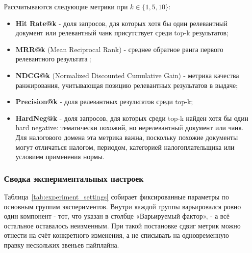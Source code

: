 \documentclass[a4paper,12pt]{article}
\begin{document}
Рассчитываются следующие метрики при $k \in \{1, 5, 10\}$:
\begin{itemize}
  \item \textbf{Hit Rate@k} - доля запросов, для которых хотя бы один релевантный документ или релевантный чанк присутствует среди top-k результатов;
  \item \textbf{MRR@k} (Mean Reciprocal Rank) - среднее обратное ранга первого релевантного результата \cite{voorhees1999mrr};
  \item \textbf{NDCG@k} (Normalized Discounted Cumulative Gain) - метрика качества ранжирования, учитывающая позицию релевантных результатов в выдаче;
  \item \textbf{Precision@k} - доля релевантных результатов среди top-k;
  \item \textbf{HardNeg@k} - доля запросов, для которых среди top-k найден хотя бы один hard negative: тематически похожий, но нерелевантный документ или чанк. Для налогового домена эта метрика важна, поскольку похожие документы могут отличаться налогом, периодом, категорией налогоплательщика или условием применения нормы.
\end{itemize}

\subsubsection{Сводка экспериментальных настроек}

Таблица~\ref{tab:experiment_settings} собирает фиксированные параметры по основным группам экспериментов. Внутри каждой группы варьировался ровно один компонент - тот, что указан в столбце «Варьируемый фактор», - а всё остальное оставалось неизменным. При такой постановке сдвиг метрик можно отнести на счёт конкретного изменения, а не списывать на одновременную правку нескольких звеньев пайплайна.
\end{document}
